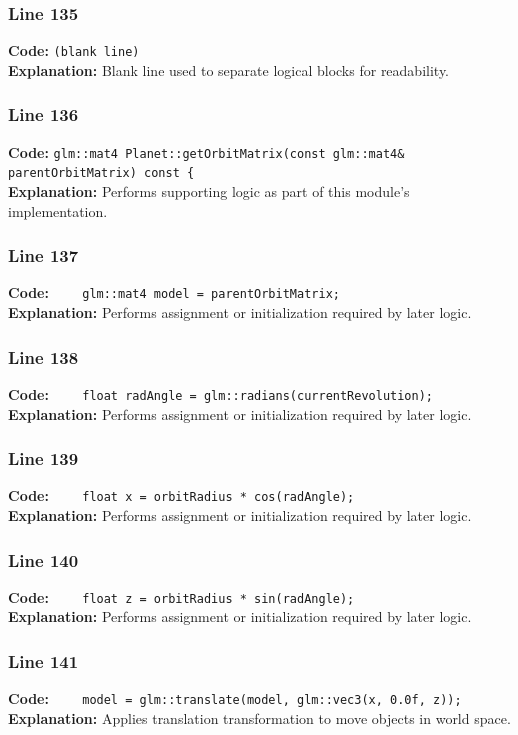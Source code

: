 \documentclass[11pt,a4paper]{article}
\begin{document}
\subsubsection*{Line 135}
\textbf{Code:} \texttt{(blank line)}\\
\textbf{Explanation:} Blank line used to separate logical blocks for readability.

\subsubsection*{Line 136}
\textbf{Code:} \verb|glm::mat4 Planet::getOrbitMatrix(const glm::mat4& parentOrbitMatrix) const {|\\
\textbf{Explanation:} Performs supporting logic as part of this module's implementation.

\subsubsection*{Line 137}
\textbf{Code:} \verb|    glm::mat4 model = parentOrbitMatrix;|\\
\textbf{Explanation:} Performs assignment or initialization required by later logic.

\subsubsection*{Line 138}
\textbf{Code:} \verb|    float radAngle = glm::radians(currentRevolution);|\\
\textbf{Explanation:} Performs assignment or initialization required by later logic.

\subsubsection*{Line 139}
\textbf{Code:} \verb|    float x = orbitRadius * cos(radAngle);|\\
\textbf{Explanation:} Performs assignment or initialization required by later logic.

\subsubsection*{Line 140}
\textbf{Code:} \verb|    float z = orbitRadius * sin(radAngle);|\\
\textbf{Explanation:} Performs assignment or initialization required by later logic.

\subsubsection*{Line 141}
\textbf{Code:} \verb|    model = glm::translate(model, glm::vec3(x, 0.0f, z));|\\
\textbf{Explanation:} Applies translation transformation to move objects in world space.
\end{document}
